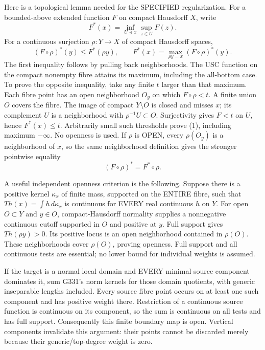 Here is a topological lemma needed for the SPECIFIED regularization. For a bounded-above extended function $F$ on compact Hausdorff $X$, write
\[
F^*(x)=\inf_{U\ni x}\sup_{z\in U}F(z).
\]
For a continuous surjection $\rho:Y\to X$ of compact Hausdorff spaces,
\[
(F\circ\rho)^*(y)\le F^*(\rho y),\qquad
F^*(x)=\max_{\rho y=x}(F\circ\rho)^*(y).                 \tag{1}
\]
The first inequality follows by pulling back neighborhoods. The USC function on the compact nonempty fibre attains its maximum, including the all-bottom case. To prove the opposite inequality, take any finite $t$ larger than that maximum. Each fibre point has an open neighborhood $O_y$ on which $F\circ\rho<t$. A finite union $O$ covers the fibre. The image of compact $Y\setminus O$ is closed and misses $x$; its complement $U$ is a neighborhood with $\rho^{-1}U\subset O$. Surjectivity gives $F<t$ on $U$, hence $F^*(x)\le t$. Arbitrarily small such thresholds prove (1), including maximum $-\infty$. No openness is used. If $\rho$ is OPEN, every $\rho(O_y)$ is a neighborhood of $x$, so the same neighborhood definition gives the stronger pointwise equality
\[
(F\circ\rho)^*=F^*\circ\rho.                          \tag{2}
\]

A useful independent openness criterion is the following. Suppose there is a positive kernel $\kappa_x$ of finite mass, supported on the ENTIRE fibre, such that $Th(x)=\int h\,d\kappa_x$ is continuous for EVERY real continuous $h$ on $Y$. For open $O\subset Y$ and $y\in O$, compact-Hausdorff normality supplies a nonnegative continuous cutoff supported in $O$ and positive at $y$. Full support gives $Th(\rho y)>0$. Its positive locus is an open neighborhood contained in $\rho(O)$. These neighborhoods cover $\rho(O)$, proving openness. Full support and all continuous tests are essential; no lower bound for individual weights is assumed.

If the target is a normal local domain and EVERY minimal source component dominates it, sum G331's norm kernels for those domain quotients, with generic inseparable lengths included. Every source fibre point occurs on at least one such component and has positive weight there. Restriction of a continuous source function is continuous on its component, so the sum is continuous on all tests and has full support. Consequently this finite boundary map is open. Vertical components invalidate this argument: their points cannot be discarded merely because their generic/top-degree weight is zero.
